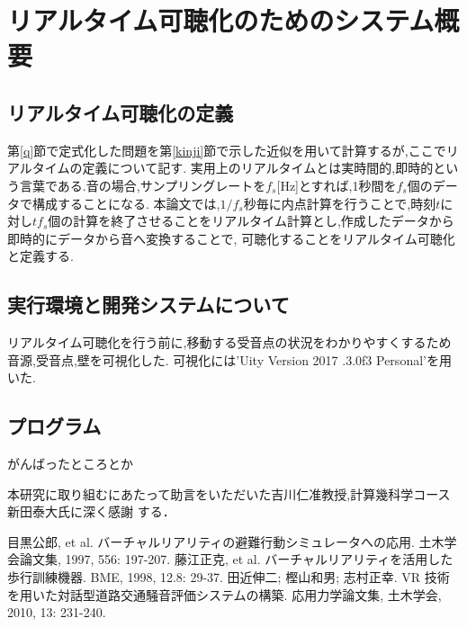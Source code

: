 \documentclass[dvipdfmx]{ampbt}
\begin{document}
\section{リアルタイム可聴化のためのシステム概要}
\subsection{リアルタイム可聴化の定義}
第\ref{q}節で定式化した問題を第\ref{kinji}節で示した近似を用いて計算するが,ここでリアルタイムの定義について記す.
実用上のリアルタイムとは実時間的,即時的という言葉である.音の場合,サンプリングレートを$f_s$[Hz]とすれば,1秒間を$f_s$個のデータで構成することになる.
本論文では,$1/f_s$秒毎に内点計算を行うことで,時刻$t$に対し$tf_s$個の計算を終了させることをリアルタイム計算とし,作成したデータから即時的にデータから音へ変換することで,
可聴化することをリアルタイム可聴化と定義する.

\subsection{実行環境と開発システムについて}
リアルタイム可聴化を行う前に,移動する受音点の状況をわかりやすくするため音源,受音点,壁を可視化した.
可視化には'Uity Version 2017 .3.0f3 Personal'を用いた.
\subsection{プログラム}
がんばったところとか




\clearpage
\acknowledgment
本研究に取り組むにあたって助言をいただいた吉川仁准教授,計算幾科学コース新田泰大氏に深く感謝
する．

\begin{thebibliography}{10}
目黒公郎, et al. バーチャルリアリティの避難行動シミュレータへの応用. 土木学会論文集, 1997, 556: 197-207.
藤江正克, et al. バーチャルリアリティを活用した歩行訓練機器. BME, 1998, 12.8: 29-37.
田近伸二; 樫山和男; 志村正幸. VR 技術を用いた対話型道路交通騒音評価システムの構築. 応用力学論文集, 土木学会, 2010, 13: 231-240.
\end{thebibliography}
\end{document}
